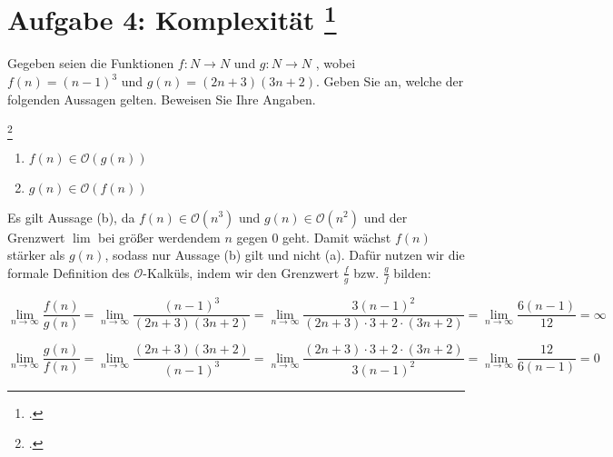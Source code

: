 \documentclass{lehramt-informatik-aufgabe}
\begin{document}

\section{Aufgabe 4: Komplexität
\footcite[Thema 2 Aufgabe 6: O-Notation]{examen:66115:2012:09}
}

Gegeben seien die Funktionen $f : N \rightarrow N$ und $g : N \rightarrow N$ , wobei $f (n)
= (n - 1)^3$ und $g(n) = (2n + 3)(3n + 2)$. Geben Sie an, welche der
folgenden Aussagen gelten. Beweisen Sie Ihre Angaben.

\footcite{aud:ab:2}
\begin{enumerate}
\item $f(n) \in \mathcal{O}(g(n))$
\item $g(n) \in \mathcal{O}(f(n))$
\end{enumerate}

\begin{liAntwort}
Es gilt Aussage (b), da $f(n) \in \mathcal{O}(n^3)$ und $g(n) \in
\mathcal{O}(n^2)$ und der Grenzwert $\lim$ bei größer werdendem $n$
gegen $0$ geht. Damit wächst $f (n)$ stärker als $g(n)$, sodass nur
Aussage (b) gilt und nicht (a). Dafür nutzen wir die formale Definition
des $\mathcal{O}$-Kalküls, indem wir den Grenzwert $\frac{f}{g}$ bzw.
$\frac{g}{f}$ bilden:

{
\footnotesize
\begin{displaymath}
\lim_{n \to \infty}
\frac{f(n)}
{g(n)}
=
\lim_{n \to \infty}
\frac{(n - 1)^3}
{(2n + 3)(3n + 2)}
=
\lim_{n \to \infty}
\frac{3(n - 1)^2}
{(2n + 3) \cdot 3 + 2 \cdot (3n + 2)}
=
\lim_{n \to \infty}
\frac{6(n - 1)}
{12}
=
\infty
\end{displaymath}

\begin{displaymath}
\lim_{n \to \infty}
\frac{g(n)}
{f(n)}
=
\lim_{n \to \infty}
\frac{(2n + 3)(3n + 2)}
{(n - 1)^3}
=
\lim_{n \to \infty}
\frac{(2n + 3) \cdot 3 + 2 \cdot (3n + 2)}
{3(n - 1)^2}
=
\lim_{n \to \infty}
\frac{12}
{6(n - 1)}
=
0
\end{displaymath}
}
\end{liAntwort}
\end{document}
